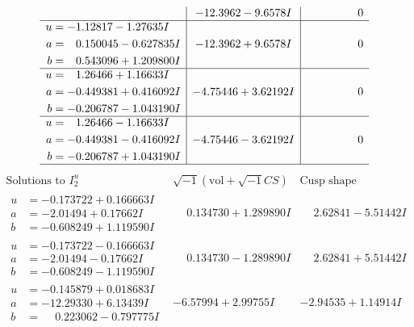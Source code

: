 \documentclass[1p]{elsarticle_modified}
\theoremstyle{definition}
\newcommand{\I}{\sqrt{-1}}
\begin{document}
$$\begin{array}{c|c|c}
 & -12.3962 - 9.6578 I & \phantom{-0.000000 } 0 \\ \hline\begin{aligned}
u &= -1.12817 - 1.27635 I \\
a &= \phantom{-}0.150045 - 0.627835 I \\
b &= \phantom{-}0.543096 + 1.209800 I\end{aligned}
 & -12.3962 + 9.6578 I & \phantom{-0.000000 } 0 \\ \hline\begin{aligned}
u &= \phantom{-}1.26466 + 1.16633 I \\
a &= -0.449381 + 0.416092 I \\
b &= -0.206787 - 1.043190 I\end{aligned}
 & -4.75446 + 3.62192 I & \phantom{-0.000000 } 0 \\ \hline\begin{aligned}
u &= \phantom{-}1.26466 - 1.16633 I \\
a &= -0.449381 - 0.416092 I \\
b &= -0.206787 + 1.043190 I\end{aligned}
 & -4.75446 - 3.62192 I & \phantom{-0.000000 } 0\\
 \hline 
 \end{array}$$\newpage$$\begin{array}{c|c|c}  
\text{Solutions to }I^u_{2}& \I (\text{vol} + \sqrt{-1}CS) & \text{Cusp shape}\\
 \hline 
\begin{aligned}
u &= -0.173722 + 0.166663 I \\
a &= -2.01494 + 0.17662 I \\
b &= -0.608249 + 1.119590 I\end{aligned}
 & \phantom{-}0.134730 + 1.289890 I & \phantom{-}2.62841 - 5.51442 I \\ \hline\begin{aligned}
u &= -0.173722 - 0.166663 I \\
a &= -2.01494 - 0.17662 I \\
b &= -0.608249 - 1.119590 I\end{aligned}
 & \phantom{-}0.134730 - 1.289890 I & \phantom{-}2.62841 + 5.51442 I \\ \hline\begin{aligned}
u &= -0.145879 + 0.018683 I \\
a &= -12.29330 + 6.13439 I \\
b &= \phantom{-}0.223062 - 0.797775 I\end{aligned}
 & -6.57994 + 2.99755 I & -2.94535 + 1.14914 I \\ \hline\begin{aligned}

\end{aligned}
\end{array}$$
\end{document}
